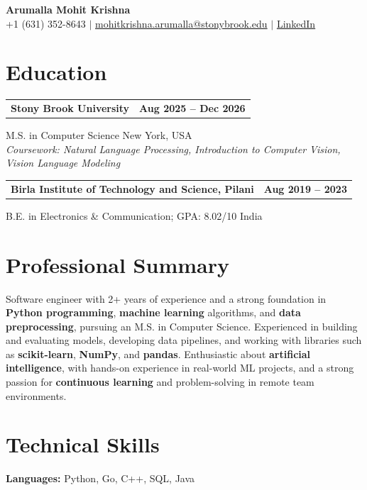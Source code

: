 \documentclass[letterpaper,10pt]{article}
\makeatletter
\newcommand{\entry}[2]{%
  \noindent
  \begin{tabularx}{\linewidth}
    {@{}>{\raggedright\arraybackslash}X@{\hspace{6pt}}r@{}}
    \textbf{#1} & #2
  \end{tabularx}\par
}
\makeatother
\begin{document}
\begin{center}
    {\LARGE\bfseries Arumalla Mohit Krishna}\\[3pt]
    +1 (631) 352-8643 $|$
    \href{mailto:mohitkrishna.arumalla@stonybrook.edu}
    {mohitkrishna.arumalla@stonybrook.edu} $|$
    \href{https://linkedin.com/in/mohit-krishna-arumalla}
    {LinkedIn}
\end{center}
\vspace{-8pt}

\section{Education}

\entry
  {\textbf{Stony Brook University}}
  {\textbf{Aug 2025 -- Dec 2026}}

M.S. in Computer Science \hfill New York, USA\\
\textit{
Coursework: Natural Language Processing,
Introduction to Computer Vision, Vision Language Modeling
}
\vspace{3pt}

\entry
  {\textbf{Birla Institute of Technology and Science, Pilani}}
  {\textbf{Aug 2019 -- 2023}}

B.E. in Electronics \& Communication; GPA: 8.02/10 \hfill India
\section{Professional Summary}

Software engineer with 2+ years of experience and a strong foundation in \textbf{Python programming}, \textbf{machine learning} algorithms, and \textbf{data preprocessing}, pursuing an M.S. in Computer Science. Experienced in building and evaluating models, developing data pipelines, and working with libraries such as \textbf{scikit-learn}, \textbf{NumPy}, and \textbf{pandas}. Enthusiastic about \textbf{artificial intelligence}, with hands-on experience in real-world ML projects, and a strong passion for \textbf{continuous learning} and problem-solving in remote team environments.
\section{Technical Skills}

\textbf{Languages:}
Python, Go, C++, SQL, Java\\
\end{document}
